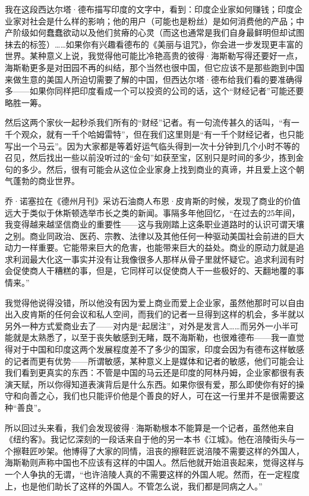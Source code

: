 我在这段西达尔塔·德布描写印度的文字中，看到：印度企业家如何赚钱；印度企业家对社会是什么样的影响；他的用户（可能也是粉丝）是如何消费他的产品；中产阶级如何蠢蠢欲动以及他们贫瘠的心灵（而这也通常是我们自身最鲜明但却试图抹去的标签）\ldots{}\ldots{}如果你有兴趣看德布的《美丽与诅咒》，你会进一步发现更丰富的世界。某种意义上说，我觉得他可能比冷艳高贵的彼得·海斯勒写得还要好一点，海斯勒更多是对田园不再的纠结，那个当然也很中国，但它应该不是那些跑到中国来做生意的美国人所迫切需要了解的中国，但西达尔塔·德布给我们看的要准确得多------如果你同样把印度看成一个可以投资的公司的话，这个``财经记者''可能还要略胜一筹。

然后这两个家伙一起秒杀我们所有的``财经''记者。有一句流传甚久的话叫，``有一千个观众，就有一千个哈姆雷特''，但在我们这里则是``有一千个财经记者，也只能写出一个马云''。因为大家都是等着好运气临头得到一次十分钟到几个小时不等的召见，然后找出一些以前没听过的``金句''如获至宝，区别只是时间的多少，拣到金句的多少。然后，很有可能会从这位企业家身上找到商业的真谛，并且爱上这个朝气蓬勃的商业世界。

乔·诺塞拉在《德州月刊》采访石油商人布恩·皮肯斯的时候，发现了商业的价值远大于类似于休斯顿选举市长之类的新闻。事隔多年他回忆，``在过去的25年间，我变得越来越坚信商业的重要性------这与我刚踏上这条职业道路时的认识可谓天壤之别。商业同政治、医药、宗教、法律以及其他任何一种驱动美国社会前进的巨大动力一样重要。它能带来巨大的危害，也能带来巨大的益处。商业的原动力就是追求利润最大化这一事实并没有让我像很多人那样从骨子里就怀疑它。追求利润有时会促使商人干糟糕的事，但是，它同样可以促使商人干一些极好的、天翻地覆的事情来。''

我觉得他说得没错，所以他没有因为爱上商业而爱上企业家，虽然他那时可以自由出入皮肯斯的任何会议和私人空间，而我们的记者一旦得到这样的机会，多半就以另外一种方式爱商业去了------对内是``起居注''，对外是发言人\ldots{}\ldots{}而另外一小半可能就是太熟悉了，以至于丧失敏感到无睹，既不海斯勒，也很难德布------我一直觉得对于中国和印度这两个发展程度差不了多少的国家，印度会因为有德布这样敏感的记者而更有优势------所谓敏感，某种意义上是媒体和记者的敏感，他们可能会让我们看到更真实的东西：不管是中国的马云还是印度的阿林丹姆，企业家都很有表演天赋，所以你得知道表演背后是什么东西。如果你很有爱，那么即使你有好的操守和向善之心，我们也只能评价他是个善良的好人，可在这一行里并不是很需要这种``善良''。

所以回过头来看，我们会发现彼得·海斯勒根本不能算是一个记者，虽然他来自《纽约客》。我记忆深刻的一段话来自于他的另一本书《江城》。他在涪陵街头与一个擦鞋匠吵架。他博得了大家的同情，沮丧的擦鞋匠说涪陵不需要这样的外国人，海斯勒则声称中国也不应该有这样的中国人。然后他就开始沮丧起来，觉得这样与一个人争执的无谓，``也许涪陵人真的不需要这样的外国人呢。然而，在一定程度上，也是他们助长了这样的外国人。不管怎么说，我们都是同病之人。''

